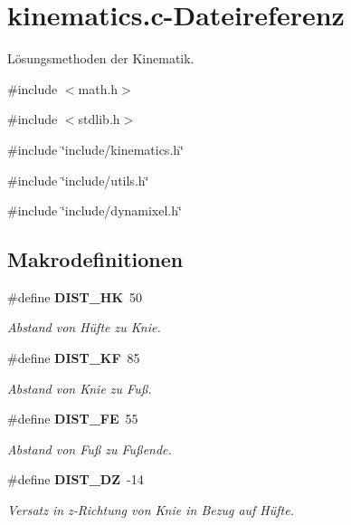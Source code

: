 \section{kinematics.c-\/Dateireferenz}
\label{kinematics_8c}


Lösungsmethoden der Kinematik.  


{\ttfamily \#include $<$math.h$>$}\par
{\ttfamily \#include $<$stdlib.h$>$}\par
{\ttfamily \#include \char`\"{}include/kinematics.h\char`\"{}}\par
{\ttfamily \#include \char`\"{}include/utils.h\char`\"{}}\par
{\ttfamily \#include \char`\"{}include/dynamixel.h\char`\"{}}\par
\subsection*{Makrodefinitionen}
\begin{DoxyCompactItemize}
\item 
\#define {\bf DIST\_\-HK}~50
\begin{DoxyCompactList}\small\item\em Abstand von Hüfte zu Knie. \item\end{DoxyCompactList}\item 
\#define {\bf DIST\_\-KF}~85
\begin{DoxyCompactList}\small\item\em Abstand von Knie zu Fuß. \item\end{DoxyCompactList}\item 
\#define {\bf DIST\_\-FE}~55
\begin{DoxyCompactList}\small\item\em Abstand von Fuß zu Fußende. \item\end{DoxyCompactList}\item 
\#define {\bf DIST\_\-DZ}~-\/14
\begin{DoxyCompactList}\small\item\em Versatz in z-\/Richtung von Knie in Bezug auf Hüfte. \item\end{DoxyCompactList}\end{DoxyCompactItemize}
